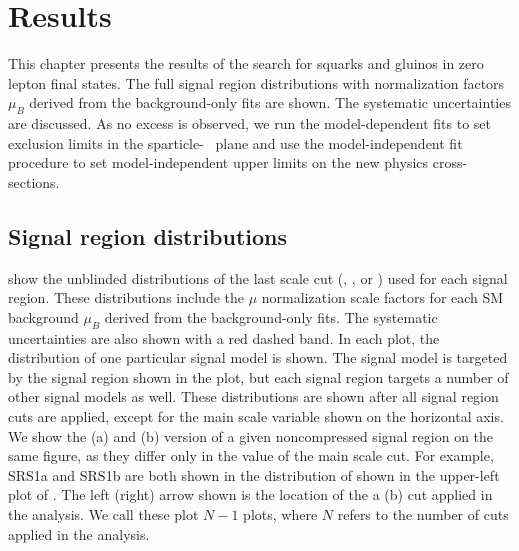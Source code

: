 

\chapter[Results][Results]{Results}

This chapter presents the results of the search for squarks and gluinos in zero lepton final states.
The full signal region distributions with normalization factors $\mu_B$ derived from the background-only fits are shown.
The systematic uncertainties are discussed.
As no excess is observed, we run the model-dependent fits to set exclusion limits in the sparticle-\lsp~ plane and use the model-independent fit procedure to set model-independent upper limits on the new physics cross-sections.

\section{Signal region distributions}


 show the unblinded distributions of the last scale cut  (\ptisr, , or ) used for each signal region.
These distributions include the $\mu$ normalization scale factors for each SM background $\mu_B$ derived from the background-only fits.
The systematic uncertainties are also shown with a red dashed band.
In each plot, the distribution of one particular signal model is shown.
The signal model is targeted by the signal region shown in the plot, but each signal region targets a number of other signal models as well.
These distributions are shown after all signal region cuts are applied, except for the main scale variable shown on the horizontal axis.
We show the (a) and (b) version of a given noncompressed signal region on the same figure, as they differ only in the value of the main scale cut.
For example, SRS1a and SRS1b are both shown in the distribution of  shown in the upper-left plot of .
The left (right) arrow shown is the location of the a (b) cut applied in the analysis.
We call these plot \textit{$N-1$} plots, where $N$ refers to the number of cuts applied in the analysis.

